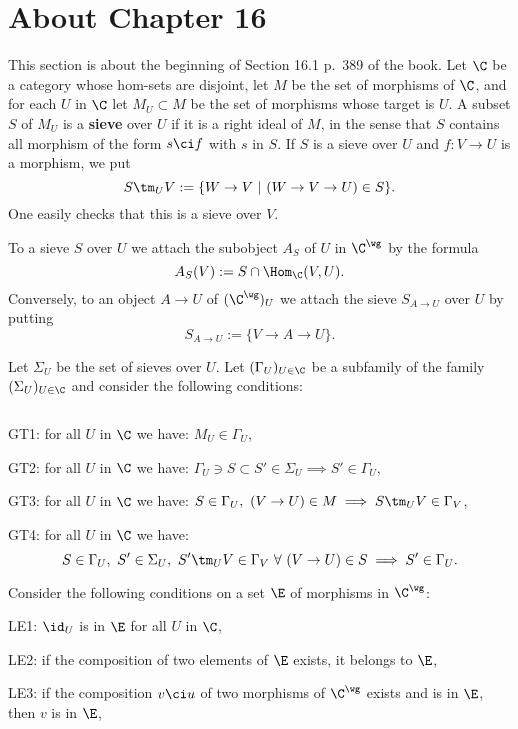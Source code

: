 \documentclass[12pt]{article}
\theoremstyle{remark}
\theoremstyle{definition}
\begin{document}

\section{About Chapter 16}


This section is about the beginning of Section 16.1 p.~389 of the book. Let $\C$ be a category whose hom-sets are disjoint, let $M$ be the set of morphisms of $\C$, and for each $U$ in $\C$ let $M_U\subset M$ be the set of morphisms whose target is $U$. A subset $S$ of $M_U$ is a \textbf{sieve}  over $U$ if it is a right ideal of $M$, in the sense that $S$ contains all morphism of the form $s\ci f$ with $s$ in $S$. If $S$ is a sieve over $U$ and $f:V\to U$ is a morphism, we put
$$
S\tm_UV:=\{W\to V\ |\ (W\to V\to U)\in S\}.
$$
One easily checks that this is a sieve over $V$. 

To a sieve $S$ over $U$ we attach the subobject $A_S$ of $U$ in $\C^\wg$ by the formula
$$
A_S(V):=S\cap\Hom_\C(V,U).
$$ 
Conversely, to an object $A\to U$ of $(\C^\wg)_U$ we attach the sieve $S_{A\to U}$ over $U$ by putting 
$$
S_{A\to U}:=\{V\to A\to U\}.
$$ 

Let $\Sigma_U$ be the set of sieves over $U$. Let $(\Gamma_U)_{U\in\C}$ be a subfamily of the family $(\Sigma_U)_{U\in\C}$ and consider the following conditions:

\begin{cond}
$\ $

\nn GT1: for all $U$ in $\C$ we have: $M_U\in\Gamma_U$,

\nn GT2: for all $U$ in $\C$ we have: $\Gamma_U\ni S\subset S'\in\Sigma_U\implies S'\in\Gamma_U$,

\nn GT3: for all $U$ in $\C$ we have: $S\in\Gamma_U,\ (V\to U)\in M\implies S\tm_UV\in\Gamma_V$,

\nn GT4: for all $U$ in $\C$ we have: 
$$
S\in\Gamma_U,\ S'\in\Sigma_U,\ S'\tm_UV\in\Gamma_V\ \forall\ (V\to U)\in S\implies S'\in\Gamma_U.
$$
\end{cond}

Consider the following conditions on a set $\E$ of morphisms in $\C^\wg$:

\nn LE1: $\id_U$ is in $\E$ for all $U$ in $\C$,

\nn LE2: if the composition of two elements of $\E$ exists, it belongs to $\E$,

\nn LE3: if the composition $v\ci u$ of two morphisms of $\C^\wg$ exists and is in $\E$, then $v$ is in $\E$,
\end{document}
